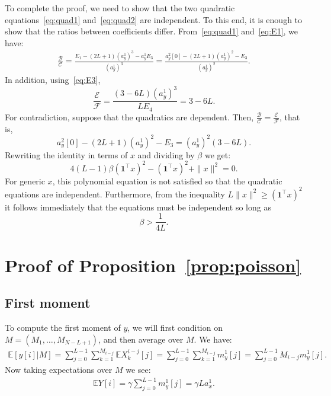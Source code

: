 \documentclass[12pt]{article}
\newcommand{\E}{\mathbb{E}}
\newcommand{\1}{\mathbf{1}}
\theoremstyle{plain}
\theoremstyle{definition}
\theoremstyle{remark}
\theoremstyle{plain}
\theoremstyle{remark}
\theoremstyle{plain}
\theoremstyle{plain}
\theoremstyle{plain}
\numberwithin{equation}{section}
\begin{document}
To complete the proof, we need to show that the two quadratic equations~\eqref{eq:quad1} and~\eqref{eq:quad2} are independent. To this end, it is enough to show that the ratios between coefficients differ. 
From~\eqref{eq:quad1} and~\eqref{eq:E1}, we have:
\begin{equation*}
\begin{split}
\frac{\mathcal{B}}{\mathcal{C}} = \frac{E_1 - (2L+1)(a_y^1)^3 - a_y^1E_3}{(a_y^1)^3} = \frac{a_y^2[0] - (2L+1)(a_y^1)^2 - E_3}{(a_y^1)^2}.
\end{split}
\end{equation*}
In addition, using~\eqref{eq:E3},
\begin{equation*}
\frac{\mathcal{E}}{\mathcal{F}} = \frac{(3-6L)(a_y^1)^3}{LE_4} = 3 - 6L . 
\end{equation*}
For contradiction, suppose that the quadratics are dependent. Then, $\frac{\mathcal{B}}{\mathcal{C}} =\frac{\mathcal{E}}{\mathcal{F}} $, that is, 	
\begin{equation*}
a_y^2[0] - (2L+1)(a_y^1)^2 - E_3 = (a_y^1)^2(3-6L).
\end{equation*}
Rewriting the identity in terms of $x$ and dividing by $\beta$ we get:
\begin{equation} \label{eq:cond}
4(L-1)\beta (\1^\top x)^2  - (\1^\top x)^2 + \|x\|^2 = 0.
\end{equation}	
For generic $x$,  this polynomial equation is not satisfied so that the quadratic equations are independent. 
Furthermore, from the inequality $L\|x\|^2 \ge (\1^\top x)^2$ it follows immediately that the equations must be independent so long as
\begin{equation*}
\beta > \frac{1}{4L}.
\end{equation*}

\section{Proof of Proposition~\ref{prop:poisson}} \label{sec:proof_prop_poisson}


\subsection{First moment}

To compute the first moment of $y$, we will first condition on $M = (M_1,\dots,M_{N-L+1})$, and then average over $M$. We have:
%
\begin{align}
%
\E[y[i] | M] = \sum_{j=0}^{L-1} \sum_{k=1}^{M_{i-j}} \E X_k^{i-j}[j]
= \sum_{j=0}^{L-1} \sum_{k=1}^{M_{i-j}} m_y^1[j]
= \sum_{j=0}^{L-1} M_{i-j} m_y^1[j].
%
\end{align}
%
Now taking expectations over $M$ we see:
%
\begin{align}
%
\E Y[i] = \gamma \sum_{j=0}^{L-1}  m_y^1[j] = \gamma La_x^1.
%
\end{align}
\end{document}
